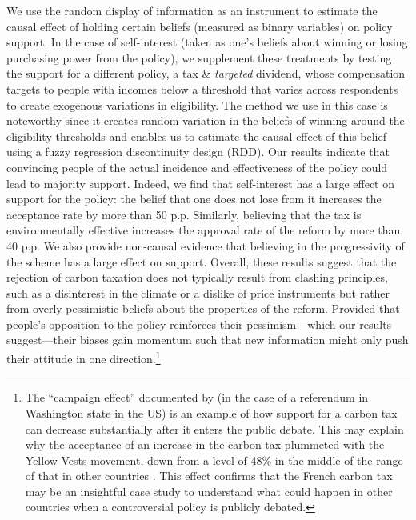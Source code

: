 \documentclass[12pt]{article} %
\begin{document}
We use the random display of information as an instrument to estimate the causal effect of holding certain beliefs (measured as binary variables) on policy support. In the case of self-interest (taken as one's beliefs about winning or losing purchasing power from the policy), we supplement these treatments by testing the support for a different policy, a tax \& \textit{targeted} dividend, whose compensation targets to people with incomes below a threshold that varies across respondents to create exogenous variations in eligibility. The method we use in this case is noteworthy since it creates random variation in the beliefs of winning around the eligibility thresholds and enables us to estimate the causal effect of this belief using a fuzzy regression discontinuity design (RDD). Our results indicate that convincing people of the actual incidence and effectiveness of the policy could lead to majority support. Indeed, we find that self-interest has a large effect on support for the policy: the belief that one does not lose from it increases the acceptance rate by more than 50 p.p. Similarly, believing that the tax is environmentally effective increases the approval rate of the reform by more than 40 p.p. We also provide non-causal evidence that believing in the progressivity of the scheme has a large effect on support. Overall, these results suggest that the rejection of carbon taxation does not typically result from clashing principles, such as a disinterest in the climate or a dislike of price instruments but rather from overly pessimistic beliefs about the properties of the reform. Provided that people's opposition to the policy reinforces their pessimism---which our results suggest---their biases gain momentum such that new information might only push their attitude in one direction.\footnote{The ``campaign effect'' documented by \citet{anderson_can_2019} (in the case of a referendum in Washington state in the US) is an example of how support for a carbon tax can decrease substantially after it enters the public debate. This may explain why the acceptance of an increase in the carbon tax plummeted with the Yellow Vests movement, down from a level of 48\% \citep{ademe_representations_2018} in the middle of the range of that in other countries \citep{brechin_public_2010}. This effect confirms that the French carbon tax may be an insightful case study to understand what could happen in other countries when a controversial policy is publicly debated.} %

\end{document}
